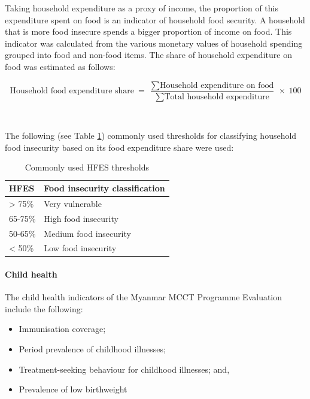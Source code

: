 \documentclass[12pt,a4paper]{article}
\let\oldparagraph\paragraph
\renewcommand{\paragraph}[1]{\oldparagraph{#1}\mbox{}}
\begin{document}
Taking household expenditure as a proxy of income, the proportion of this expenditure spent on food is an indicator of household food security. A household that is more food insecure spends a bigger proportion of income on food. This indicator was calculated from the various monetary values of household spending grouped into food and non-food items. The share of household expenditure on food was estimated as follows:

\[ \text{Household food expenditure share} ~ = ~ \frac{\sum{\text{Household expenditure on food}}}{\sum{\text{Total household expenditure}}} ~ \times ~ 100 \]

~

The following (see Table \ref{tab:hfes1}) commonly used thresholds for classifying household food insecurity based on its food expenditure share were used:

\begin{table}[H]

\caption{\label{tab:hfes1}Commonly used HFES thresholds}
\centering
\begin{tabular}[t]{ll}
\toprule
HFES & Food insecurity classification\\
\midrule
\rowcolor{gray!6}  > 75\% & Very vulnerable\\
65-75\% & High food insecurity\\
\rowcolor{gray!6}  50-65\% & Medium food insecurity\\
< 50\% & Low food insecurity\\
\bottomrule
\end{tabular}
\end{table}

\hypertarget{chealth}{%
\paragraph{Child health}\label{chealth}}

The child health indicators of the Myanmar MCCT Programme Evaluation include the following:

\begin{itemize}
\item
  Immunisation coverage;
\item
  Period prevalence of childhood illnesses;
\item
  Treatment-seeking behaviour for childhood illnesses; and,
\item
  Prevalence of low birthweight
\end{itemize}
\end{document}
